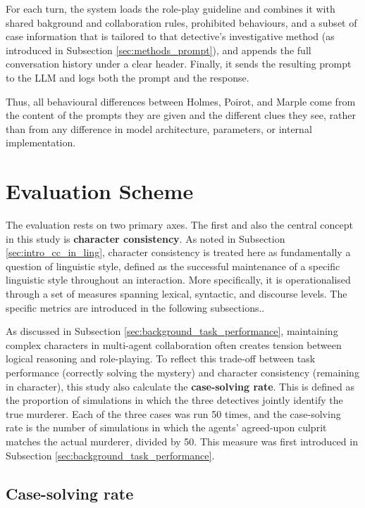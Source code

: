 \documentclass{article}
\begin{document}
For each turn, the system loads the role-play guideline and combines it with shared bakground and collaboration rules, prohibited behaviours, and a subset of case information that is tailored to that detective's investigative method (as introduced in Subsection \ref{sec:methods_prompt}), and appends the full conversation history under a clear header. Finally, it sends the resulting prompt to the LLM and logs both the prompt and the response.

Thus, all behavioural differences between Holmes, Poirot, and Marple come from the content of the prompts they are given and the different clues they see, rather than from any difference in model architecture, parameters, or internal implementation.

\section{Evaluation Scheme} \label{sec:eval}

The evaluation rests on two primary axes. The first and also the central concept in this study is \textbf{character consistency}. As noted in Subsection \ref{sec:intro_cc_in_ling}, character consistency is treated here as fundamentally a question of linguistic style, defined as the successful maintenance of a specific linguistic style throughout an interaction. More specifically, it is operationalised through a set of measures spanning lexical, syntactic, and discourse levels. The specific metrics are introduced in the following subsections..

As discussed in Subsection \ref{sec:background_task_performance}, maintaining complex characters in multi-agent collaboration often creates tension between logical reasoning and role-playing. To reflect this trade-off between task performance (correctly solving the mystery) and character consistency (remaining in character), this study also calculate the \textbf{case-solving rate}. This is defined as the proportion of simulations in which the three detectives jointly identify the true murderer. Each of the three cases was run 50 times, and the case-solving rate is the number of simulations in which the agents' agreed-upon culprit matches the actual murderer, divided by 50. This measure was first introduced in Subsection \ref{sec:background_task_performance}.

\subsection{Case-solving rate} \label{sec:eval_case-solving-rate}
\end{document}
